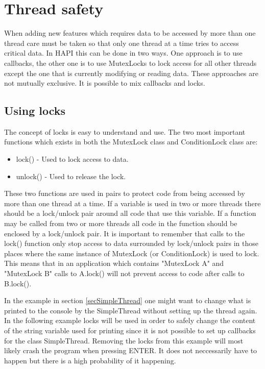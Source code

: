 

\section{Thread safety}
When adding new features which requires data to
be accessed by more than one thread care must be taken so that only one thread
at a time tries to access critical data. In HAPI this can be done in two ways.
One approach is to use callbacks, the other one is to use MutexLocks to lock
access for all other threads except the one that is currently modifying or
reading data. These approaches are not mutually exclusive. It is possible to
mix callbacks and locks.

\subsection{Using locks}
The concept of locks is easy to understand and use. The two most important
functions which exists in both the MutexLock class and ConditionLock class are:

\begin{itemize}
\item lock() - Used to lock access to data.
\item unlock() - Used to release the lock.
\end{itemize}

These two functions are used in pairs to protect code from being accessed by
more than one thread at a time. If a variable is used in two or more threads
there should be a lock/unlock pair around all code that use this variable. If a
function may be called from two or more threads all code in the function should
be enclosed by a lock/unlock pair. It is important to remember that calls to
the lock() function only stop access to data surrounded by lock/unlock pairs
in those places where the same instance of MutexLock (or ConditionLock) is used
to lock. This means that in an application which contains "MutexLock A" and
"MutexLock B" calls to A.lock() will not prevent access to code after calls to
B.lock().

In the example in section \ref{secSimpleThread} one might want to change what
is printed to the console by the SimpleThread without setting up the thread
again. In the following example locks will be used in order to safely change
the content of the string variable used for printing since it is not possible
to set up callbacks for the class SimpleThread. Removing the locks from this
example will most likely crash the program when pressing ENTER. It does not
neccessarily have to happen but there is a high probability of it happening.

